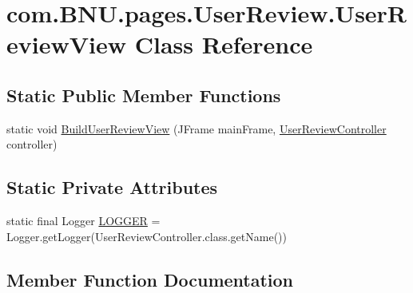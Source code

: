 \hypertarget{classcom_1_1_b_n_u_1_1pages_1_1_user_review_1_1_user_review_view}{}\section{com.\+B\+N\+U.\+pages.\+User\+Review.\+User\+Review\+View Class Reference}
\label{classcom_1_1_b_n_u_1_1pages_1_1_user_review_1_1_user_review_view}
\subsection*{Static Public Member Functions}
\begin{DoxyCompactItemize}
\item 
static void \mbox{\hyperlink{classcom_1_1_b_n_u_1_1pages_1_1_user_review_1_1_user_review_view_a37321b8e9cac5407064c15ed53e4a8ad}{Build\+User\+Review\+View}} (J\+Frame main\+Frame, \mbox{\hyperlink{classcom_1_1_b_n_u_1_1pages_1_1_user_review_1_1_user_review_controller}{User\+Review\+Controller}} controller)
\end{DoxyCompactItemize}
\subsection*{Static Private Attributes}
\begin{DoxyCompactItemize}
\item 
static final Logger \mbox{\hyperlink{classcom_1_1_b_n_u_1_1pages_1_1_user_review_1_1_user_review_view_a7d9c66fa9de93bfa310b711d8996dd5d}{L\+O\+G\+G\+ER}} = Logger.\+get\+Logger(User\+Review\+Controller.\+class.\+get\+Name())
\end{DoxyCompactItemize}


\subsection{Member Function Documentation}
\mbox{\label{classcom_1_1_b_n_u_1_1pages_1_1_user_review_1_1_user_review_view_a37321b8e9cac5407064c15ed53e4a8ad}} 

